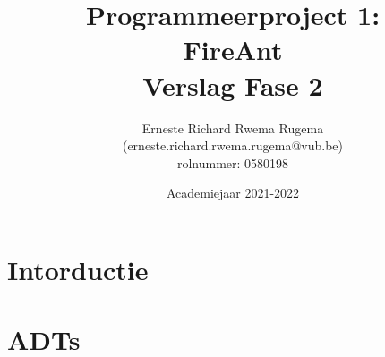 \documentclass[11pt]{report}
\title{{Programmeerproject 1:}\\
				{FireAnt}\\
				{\large Verslag Fase 2}}
\author{{Erneste Richard Rwema Rugema}\\
    {(erneste.richard.rwema.rugema@vub.be)}\\
			{\leftmark rolnummer: 0580198}}
\date{Academiejaar 2021-2022}
\begin{document}
\maketitle

\tableofcontents
\newpage

\chapter{Intorductie}


\chapter{ADTs}

\end{document}
